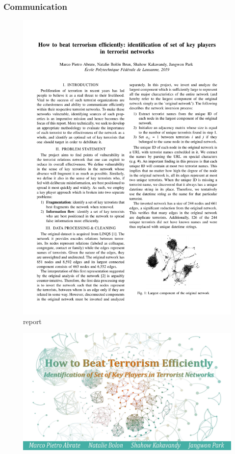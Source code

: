 \documentclass[aspectratio=169]{beamer}
\begin{document}

\begin{frame}
	\frametitle{Communication}
	\begin{minipage}[t]{0.45\linewidth}
		\begin{figure}
			\includegraphics[width=\linewidth,trim={0 20cm 0 2cm},clip]{project_27_report}
			\caption*{\color{darkred} report}
		\end{figure}
		\vspace{-1em}
		\begin{figure}
			\includegraphics[width=\linewidth,trim={0 0 0 7cm},clip]{project_27_slides}

\end{figure}
\end{minipage}
\end{frame}
\end{document}
